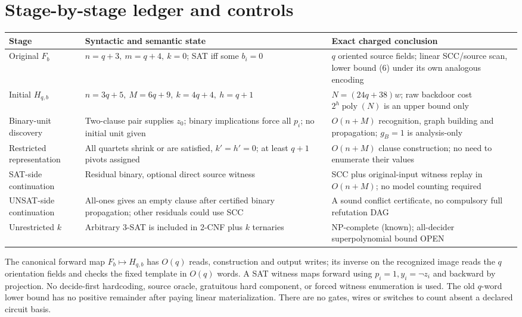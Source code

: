 \documentclass[11pt]{article}
\begin{document}
\section{Stage-by-stage ledger and controls}
\begin{center}\small
\begin{tabular}{p{.19\linewidth}p{.33\linewidth}p{.36\linewidth}}
\toprule
Stage & Syntactic and semantic state & Exact charged conclusion\\
\midrule
Original $F_b$ & $n=q+3,\ m=q+4,\ k=0$; SAT iff some $b_i=0$ &
$q$ oriented source fields; linear SCC/source scan, lower bound (6)
under its own analogous encoding\\
Initial $H_{q,b}$ & $n=3q+5,\ M=6q+9,\ k=4q+4,\ h=q+1$ &
$N=(24q+38)w$; raw backdoor cost $2^{h}\operatorname{poly}(N)$
is an upper bound only\\
Binary-unit discovery & Two-clause pair supplies $z_0$; binary
implications force all $p_i$; no initial unit given &
$O(n+M)$ recognition, graph building and propagation;
$g_B=1$ is analysis-only\\
Restricted representation & All quartets shrink or are satisfied,
$k'=h'=0$; at least $q+1$ pivots assigned &
$O(n+M)$ clause construction; no need to enumerate their values\\
SAT-side continuation & Residual binary, optional direct source witness &
SCC plus original-input witness replay in $O(n+M)$;
no model counting required\\
UNSAT-side continuation & All-ones gives an empty clause after
certified binary propagation; other residuals could use SCC &
A sound conflict certificate, no compulsory full refutation DAG\\
Unrestricted $k$ & Arbitrary 3-SAT is included in
2-CNF plus $k$ ternaries &
NP-complete (known); all-decider superpolynomial bound OPEN\\
\bottomrule
\end{tabular}
\end{center}
The canonical forward map $F_b\mapsto H_{q,b}$ has $O(q)$
reads, construction and output writes; its inverse on the
recognized image reads the $q$ orientation fields and checks
the fixed template in $O(q)$ words. A SAT witness maps forward
using $p_i=1,y_i=\neg z_i$ and backward by projection.
No decide-first hardcoding, source oracle, gratuitous hard
component, or forced witness enumeration is used.
The old $q$-word lower bound has no positive remainder after
paying linear materialization. There are no gates, wires or
switches to count absent a declared circuit basis.
\end{document}
